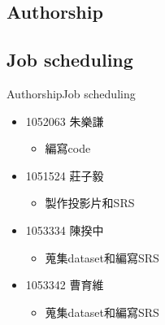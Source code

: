 \documentclass{beamer}
\begin{document}
\begin{CJK*}{UTF8}{bsmi}
\section*{Authorship}
\subsection*{Job scheduling}
\begin{frame}{Authorship}{Job scheduling}
  \begin{itemize}
  \item {
    1052063 朱樂謙
  }
   \begin{itemize}
   \item 編寫code\\[0.5cm]
   \end{itemize}
  \item {
    1051524 莊子毅
  }
   \begin{itemize}
   \item 製作投影片和SRS\\[0.5cm]
   \end{itemize}
  \item {
    1053334 陳揆中
  }
   \begin{itemize}
   \item 蒐集dataset和編寫SRS\\[0.5cm]
   \end{itemize}
  \item {
    1053342 曹育維
  }
   \begin{itemize}
   \item 蒐集dataset和編寫SRS\\[0.5cm]
   \end{itemize}
  \end{itemize}
\end{frame}
\end{CJK*}
\end{document}
